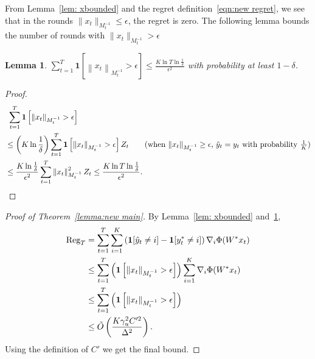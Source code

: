 \documentclass{article}
\newcommand{\Reg}{\text{\rm Reg}}
\newcommand{\one}{\boldsymbol{1}}
\newcommand{\norm}[1]{\left\|{#1}\right\|}
\newtheorem{lemma}[theorem]{Lemma}
\begin{document}
From Lemma~\ref{lem: xbounded} and the regret definition~\eqref{eqn:new regret}, we see that in the rounds $\|x_t\|_{M_t^{-1}}\leq \epsilon$, the regret is zero. The following lemma bounds the number of rounds with $\|x_t\|_{M_t^{-1}} > \epsilon $

\begin{lemma}
\label{lem:N}
$ \sum_{t=1}^T \one\left[\norm{x_t}_{M_t^{-1}}> \epsilon\right] \leq \frac{K\ln T\ln \frac{1}{\delta}}{\epsilon^2}$ with probability at least $1-\delta$. 
\end{lemma}

\begin{proof}
\begin{align*}
    &~ \sum_{t=1}^T \one\left[\norm{x_t}_{M_t^{-1}}> \epsilon\right]\\
    &\leq \left(K\ln \frac{1}{\delta}\right)\sum_{t=1}^T \one\left[\norm{x_t}_{M_t^{-1}}> \epsilon\right]Z_t \tag{when $\|x_t\|_{M_t^{-1}}\geq \epsilon$, $\tilde{y}_t=y_t$ with probability $\frac{1}{K}$} \\
    & \leq \frac{K\ln \frac{1}{\delta}}{\epsilon^2}\sum_{t=1}^T \norm{x_t}_{M_t^{-1}}^2 Z_t \leq \frac{K\ln T\ln \frac{1}{\delta}}{\epsilon^2}. 
\end{align*}
\end{proof}

\begin{proof}[Proof of Theorem~\ref{lemma:new main}]
    By Lemma~\ref{lem: xbounded} and~\ref{lem:N}, 
    \begin{align*}
        \Reg_T &= \sum_{t=1}^T \sum_{i=1}^K \left(\one[\hat{y}_t\neq i] - \one[y^*_t\neq i]\right)\nabla_i\Phi(W^*x_t) \\
        & \leq \sum_{t=1}^T \left(\one\left[\|x_t\|_{M_t^{-1}}>\epsilon\right]\right) \sum_{i=1}^K \nabla_i\Phi(W^*x_t) \\
        & \leq \sum_{t=1}^T \left(\one\left[\|x_t\|_{M_t^{-1}}>\epsilon\right]\right) \\
        & \leq \tilde{O}\left( \frac{K\gamma_u^2C'^2}{\Delta^2} \right). 
    \end{align*}
    Using the definition of $C'$ we get the final bound. 
\end{proof}
\end{document}
